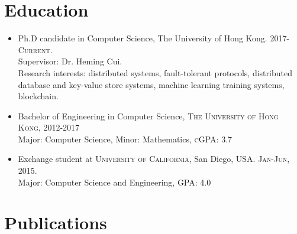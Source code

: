 \documentclass[a4paper,8pt]{article} %
\begin{document}
\pagestyle{empty} %

\par{\bigskip\par} %

\section{Education}

\begin{itemize}

\item Ph.D candidate in Computer Science, The University of Hong Kong. \textsc{2017-Current}. \\
{\footnotesize{}\selectfont Supervisor: Dr. Heming Cui.} \\
{\footnotesize{}\selectfont Research interests: distributed systems, fault-tolerant protocols, distributed database and key-value store systems, machine learning training systems, blockchain.}

\item Bachelor of Engineering in Computer Science, \textsc{The University of Hong Kong}, \textsc{2012-2017} \\
{\footnotesize{}\selectfont Major: Computer Science, Minor: Mathematics, \textsc{cGPA}: 3.7}

\item Exchange student at \textsc{University of California}, San Diego, USA. \textsc{Jan-Jun}, 2015.  \\
{\footnotesize{}\selectfont Major: Computer Science and Engineering, \textsc{GPA}: 4.0 }


\end{itemize}

\section{Publications}
\end{document}
